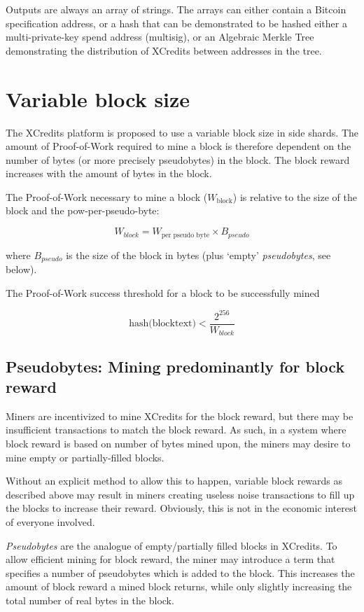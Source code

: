 \documentclass[a4paper,12pt]{article}
\begin{document}
Outputs are always an array of strings. The arrays can either contain a Bitcoin specification address, or a hash that can be demonstrated to be hashed either a multi-private-key spend address (multisig), or an Algebraic Merkle Tree demonstrating the distribution of XCredits between addresses in the tree.





\section{Variable block size}\label{variable-block-size}
The XCredits platform is proposed to use a variable block size in side shards. The amount of Proof-of-Work required to mine a block is therefore dependent on the number of bytes (or more precisely \gls{pseudobytes}) in the block. The block reward increases with the amount of bytes in the block. 

The Proof-of-Work necessary to mine a block ($W_{\text{block}}$) is relative to the size of the block and the \gls{pow-per-pseudo-byte}:

\[W_{block} = W_{\text{per pseudo byte}} \times B_{pseudo}\]

where $B_{pseudo}$ is the size of the block in bytes (plus `empty' \textit{pseudobytes}, see below). 

The Proof-of-Work success threshold for a block to be successfully mined 

\[\text{hash(blocktext)} < \frac{2^{256}}{W_{block}} \]


\subsection{Pseudobytes: Mining predominantly for block reward}
Miners are incentivized to mine XCredits for the block reward, but there may be insufficient transactions to match the block reward. As such, in a system where block reward is based on number of bytes mined upon, the miners may desire to mine empty or partially-filled blocks.

Without an explicit method to allow this to happen, variable block rewards as described above may result in miners creating useless noise transactions to fill up the blocks to increase their reward. Obviously, this is not in the economic interest of everyone involved.

\textit{Pseudobytes} are the analogue of empty/partially filled blocks in XCredits. To allow efficient mining for block reward, the miner may introduce a term that specifies a number of pseudobytes which is added to the block. This increases the amount of block reward a mined block returns, while only slightly increasing the total number of real bytes in the block. 
\end{document}
